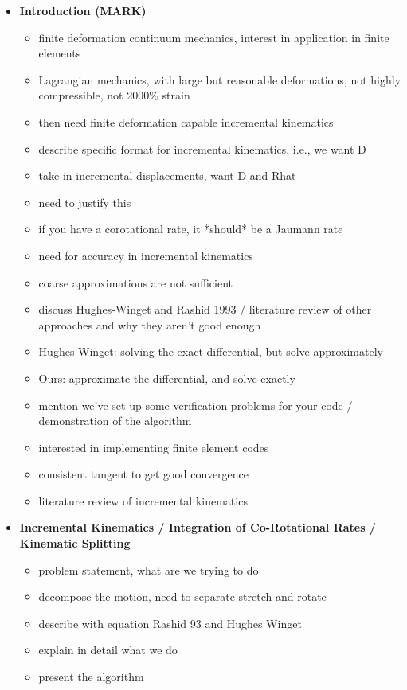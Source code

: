 \begin{itemize}
\item {\bf Introduction (MARK)}
\begin{itemize}
\item finite deformation continuum mechanics, interest in application in finite elements
\item Lagrangian mechanics, with large but reasonable deformations, not highly compressible, not 2000\% strain
\item then need finite deformation capable incremental kinematics
\item describe specific format for incremental kinematics, i.e., we want D
\item take in incremental displacements, want D and Rhat
\item need to justify this
\item if you have a corotational rate, it *should* be a Jaumann rate
\item need for accuracy in incremental kinematics
\item coarse approximations are not sufficient
\item discuss Hughes-Winget and Rashid 1993 / literature review of other approaches and why they aren't good enough
\item Hughes-Winget: solving the exact differential, but solve approximately
\item Ours: approximate the differential, and solve exactly
\item mention we've set up some verification problems for your code / demonstration of the algorithm
\item interested in implementing finite element codes
\item consistent tangent to get good convergence
\item literature review of incremental kinematics
\end{itemize}

\item {\bf Incremental Kinematics / Integration of Co-Rotational Rates / Kinematic Splitting}
\begin{itemize}
\item problem statement, what are we trying to do
\item decompose the motion, need to separate stretch and rotate
\item describe with equation Rashid 93 and Hughes Winget
\item explain in detail what we do
\item present the algorithm
\end{itemize}


\end{itemize}

